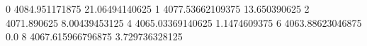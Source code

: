 0 4084.951171875 21.06494140625
1 4077.53662109375 13.650390625
2 4071.890625 8.00439453125
4 4065.03369140625 1.1474609375
6 4063.88623046875 0.0
8 4067.615966796875 3.729736328125
